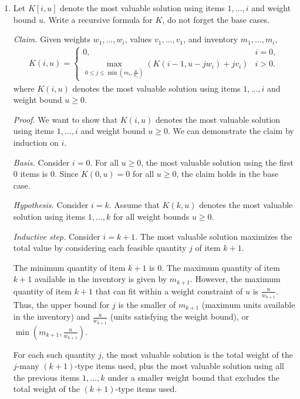 \begin{enumerate}
    \item Let $K[i,u]$ denote the most valuable solution using items $1,\ldots,i$ and weight bound $u$. Write a recursive formula for $K$, do not forget the base cases.

\begin{solution}
\textit{Claim. }Given weights $w_1,\dots,w_i$, values $v_1,\dots,v_1$, and inventory $m_1,\dots,m_i$,
\begin{align*}
K(i,u)=\begin{cases}
0,&i=0,\\
{\underset{0\leq j\leq\min\left(m_i,\frac{u}{w_i}\right)}{\max}}\left(K(i-1,u-jw_i)+jv_i\right)&i>0.
\end{cases}
\end{align*}
where $K(i,u)$ denotes the most valuable solution using items $1,\dots,i$ and weight bound $u\geq 0$. 

\textit{Proof. }We want to show that $K(i,u)$ denotes the most valuable solution using items $1,\dots,i$ and weight bound $u\geq 0$. We can demonstrate the claim by induction on $i$.

\textit{Basis. }Consider $i=0$. For all $u\geq 0$, the most valuable solution using the first $0$ items is $0$. Since $K(0,u)=0$ for all $u\geq 0$, the claim holds in the base case.

\textit{Hypothesis. }Consider $i=k$. Assume that $K(k,u)$ denotes the most valuable solution using items $1,\dots,k$ for all weight bounds $u\geq 0$.

\textit{Inductive step. }Consider $i=k+1$. The most valuable solution maximizes the total value by considering each feasible quantity $j$ of item $k+1$.

The minimum quantity of item $k+1$ is $0$. The maximum quantity of item $k+1$ available in the inventory is given by $m_{k+1}$. However, the maximum quantity of item $k+1$ that can fit within a weight constraint of $u$ is $\frac{u}{w_{k+1}}$. Thus, the upper bound for $j$ is the smaller of $m_{k+1}$ (maximum units available in the inventory) and $\frac{u}{w_{k+1}}$ (units satisfying the weight bound), or $\min\left(m_{k+1},\frac{u}{w_{k+1}}\right)$.

For each such quantity $j$, the most valuable solution is the total weight of the $j$-many $(k+1)$-type items used, plus the most valuable solution using all the previous items $1,\dots,k$ under a smaller weight bound that excludes the total weight of the $(k+1)$-type items used. 


\end{solution}
\end{enumerate}

